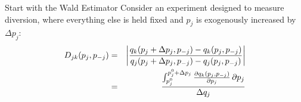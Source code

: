 \documentclass[xcolor=pdftex,dvipsnames,table,mathserif,aspectratio=169]{beamer}
\begin{document}

\begin{frame}{Start with the Wald Estimator}
Consider an experiment designed to measure diversion, where everything else is held fixed and $p_j$ is exogenously increased by $\Delta p_j$:
\begin{eqnarray*}
\small
D_{jk}(p_j,p_{-j}) &=&  \left| \frac{q_{k}(p_j+\Delta p_j,p_{-j}) - q_{k}(p_j,p_{-j})}{q_{j}(p_j+\Delta p_j,p_{-j}) - q_{j}(p_j,p_{-j})}   \right|  \\
&=& 
 \frac{\int_{p_j^{0}}^{p_j^0+\Delta p_j}  \frac{\partial q_k(p_j,p_{-j})}{\partial p_j}\,\partial p_j }{\Delta q_j}
\end{eqnarray*}
\end{frame}
\end{document}
